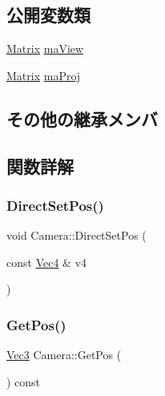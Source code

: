 \subsection*{公開変数類}
\begin{DoxyCompactItemize}
\item 
\mbox{\hyperlink{common_8h_ac6b2f2a47a728f9de5b5700d5aea93de}{Matrix}} \mbox{\hyperlink{class_camera_ac762f84210cdf6a30b0b311c943bd236}{ma\+View}}
\item 
\mbox{\hyperlink{common_8h_ac6b2f2a47a728f9de5b5700d5aea93de}{Matrix}} \mbox{\hyperlink{class_camera_aad6337f1b3a5528df50ab0fe0f3ad1cb}{ma\+Proj}}
\end{DoxyCompactItemize}
\subsection*{その他の継承メンバ}


\subsection{関数詳解}
\mbox{\label{class_camera_accd0432b75906777ddd6799f51d1fb44}} 
\subsubsection{\texorpdfstring{Direct\+Set\+Pos()}{DirectSetPos()}}
{\footnotesize\ttfamily void Camera\+::\+Direct\+Set\+Pos (\begin{DoxyParamCaption}\item[{const \mbox{\hyperlink{common_8h_a0eafa16de452739414b9c28b2d6cfa97}{Vec4}} \&}]{v4 }\end{DoxyParamCaption})\hspace{0.3cm}{\ttfamily [inline]}}

\mbox{\label{class_camera_af2812a7f744fc11a5481b791d5d66087}} 
\subsubsection{\texorpdfstring{Get\+Pos()}{GetPos()}}
{\footnotesize\ttfamily \mbox{\hyperlink{common_8h_ab1cb35b3a17c398d8ef71d5f779808bf}{Vec3}} Camera\+::\+Get\+Pos (\begin{DoxyParamCaption}{ }\end{DoxyParamCaption}) const}

